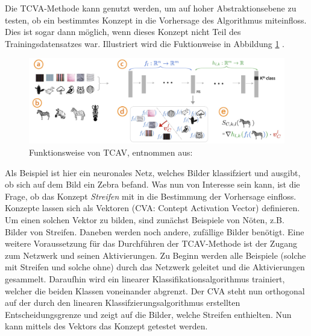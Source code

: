 Die TCVA-Methode kann genutzt werden, um auf hoher Abstraktionsebene zu testen, ob ein bestimmtes Konzept in die Vorhersage des Algorithmus miteinfloss. Dies ist sogar dann möglich, wenn dieses Konzept nicht Teil des Trainingsdatensatzes war. Illustriert wird die Fuktionweise in Abbildung \ref{Fig:TCAV} \cite{kim2018interpretability}.

\begin{figure}[h]
    \centering
    \includegraphics[scale=0.45]{pic/MA-Bilder/Literaturrecherche/TCAV.PNG}
    \caption{Funktionsweise von TCAV, entnommen aus: \cite{kim2018interpretability}}
    \label{Fig:TCAV}
\end{figure}
Als Beispiel ist hier ein neuronales Netz, welches Bilder klassifziert und ausgibt, ob sich auf dem Bild ein Zebra befand. Was nun von Interesse sein kann, ist die Frage, ob das Konzept \emph{Streifen} mit in die Bestimmung der Vorhersage einfloss. Konzepte lassen sich als Vektoren (CVA: Contept Activation Vector) definieren. Um einen solchen Vektor zu bilden, sind zunächst Beispiele von Nöten, z.B. Bilder von Streifen. Daneben werden noch andere, zufällige Bilder benötigt. Eine weitere Voraussetzung für das Durchführen der TCAV-Methode ist der Zugang zum Netzwerk und seinen Aktivierungen. Zu Beginn werden alle Beispiele (solche mit Streifen und solche ohne) durch das Netzwerk geleitet und die Aktivierungen gesammelt. Daraufhin wird ein linearer Klassifikationsalgorithmus trainiert, welcher die beiden Klassen voneinander abgrenzt. Der CVA steht nun orthogonal auf der durch den linearen Klassifzierungsalgorithmus erstellten Entscheidungsgrenze und zeigt auf die Bilder, welche Streifen enthielten. Nun kann mittels des Vektors das Konzept getestet werden.


